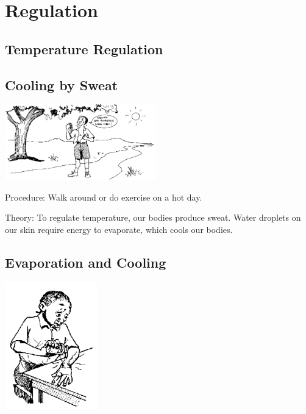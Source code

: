\section{Regulation}

\begin{multicols}{2}


\section*{Temperature Regulation}


\subsection{Cooling by Sweat}

\begin{center}
\includegraphics[width=0.49\textwidth]{./img/source/sweating.png}
\end{center}

\begin{description*}
\item[Procedure:]{Walk around or do exercise on a hot day.}
\item[Theory:]{To regulate temperature, our bodies produce sweat. Water droplets on our skin require energy to evaporate, which cools our bodies.}
\end{description*}

\vfill
\columnbreak

\subsection{Evaporation and Cooling}

\begin{center}
\includegraphics[width=0.3\textwidth]{./img/source/evap-cooling.png}
\end{center}


\end{multicols}
